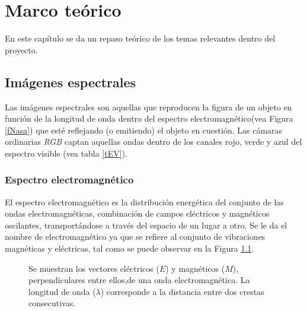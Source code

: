 \chapter{Marco teórico}
\label{Capitulo2}
En este capítulo se da un repaso teórico de los temas relevantes dentro del proyecto.

\section{Imágenes espectrales}
Las imágenes espectrales son aquellas que reproducen la figura de un objeto en función de la longitud de onda dentro del espectro electromagnético(vea Figura \ref{fNasa}) que esté reflejando (o emitiendo) el objeto en cuestión. Las cámaras ordinarias \textit{RGB} captan aquellas ondas dentro de los canales rojo, verde y azul del espectro visible (vea tabla \ref{tEV}).
\subsection{Espectro electromagnético}
El espectro electromagnético es la distribución energética del conjunto de las ondas electromagnéticas, combinación de campos eléctricos y magnéticos oscilantes, transportándose a través del espacio de un lugar a otro. Se le da el nombre de electromagnético ya que se refiere al conjunto de vibraciones magnéticas y eléctricas, tal como se puede observar en la Figura \ref{fPropagacion}.

\begin{figure}[h]
  \centering
  \centering
  \caption{Se muestran los vectores eléctricos ($E$) y magnéticos ($M$), perpendiculares entre ellos,de una onda electromagnética. La longitud de onda ($\lambda$) corresponde a la distancia entre dos crestas consecutivas. \cite{chile}}
  \label{fPropagacion}
\end{figure}

